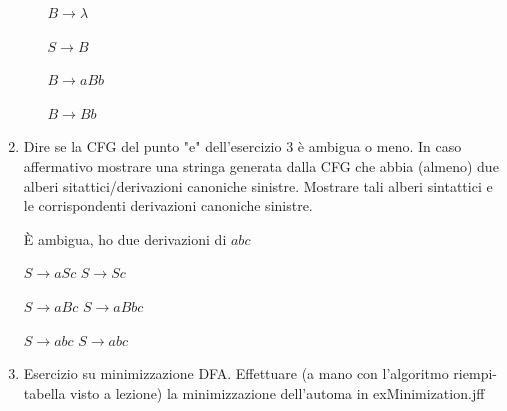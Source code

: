\begin{enumerate}
\begin{enumerate}
        $B \rightarrow \lambda$

        $S \rightarrow B$

        $B \rightarrow aBb$

        $B \rightarrow Bb$
    \end{enumerate}

  \item  Dire se la CFG del punto "e" dell'esercizio 3 è ambigua o meno. In caso affermativo mostrare una stringa generata dalla CFG che abbia (almeno) due alberi sitattici/derivazioni canoniche sinistre. Mostrare tali alberi sintattici e le corrispondenti derivazioni canoniche sinistre. 

    È ambigua, ho due derivazioni di $abc$

    $S \rightarrow aSc$ \hspace{3cm} $S \rightarrow Sc$

    $S \rightarrow aBc$ \hspace{3cm} $S \rightarrow aBbc$

    $S \rightarrow abc$ \hspace{3cm} $S \rightarrow abc$

  \item Esercizio su minimizzazione DFA. Effettuare (a mano con l'algoritmo riempi-tabella visto a lezione) la minimizzazione dell'automa in exMinimization.jff

\end{enumerate}
